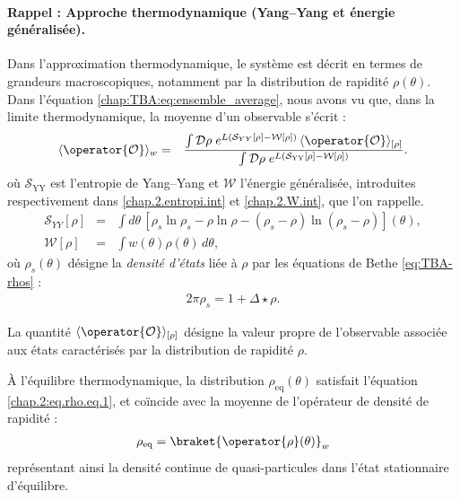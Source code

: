 \begin{mdframed}[
	linewidth=0.5pt, 
	backgroundcolor=gray!5, 
	roundcorner=50pt,	
	innerleftmargin=5pt,
    innerrightmargin=5pt,
    innertopmargin=-10pt,
    innerbottommargin=2pt,
    leftmargin=2pt,
    rightmargin=2pt
	]
\paragraph{Rappel : Approche thermodynamique (Yang–Yang et énergie généralisée).}

Dans l’approximation thermodynamique, le système est décrit en termes de grandeurs macroscopiques, notamment par la distribution de rapidité $\rho(\theta)$.  
Dans l’équation \eqref{chap:TBA:eq:ensemble_average}, nous avons vu que, dans la limite thermodynamique, la moyenne d’un observable s’écrit :
\begin{eqnarray}
	\langle \operator{\mathcal{O}} \rangle_{w} & = & \frac{\int \mathcal{D} \rho \; e^{L (\mathcal{S}_{YY}[\rho] - \mathcal{W}[\rho])} \, \langle\operator{\mathcal{O}}\rangle_{[\rho]}}{\int \mathcal{D} \rho \; e^{L (\mathcal{S}_{\mathrm{YY}}[\rho] - \mathcal{W}[\rho])}}. \label{chap:Fluc:eq:ensemble_average}
\end{eqnarray}
où $\mathcal{S}_{\mathrm{YY}}$ est l’entropie de Yang–Yang et $\mathcal{W}$ l’énergie généralisée, introduites respectivement dans \eqref{chap.2.entropi.int} et \eqref{chap.2.W.int}, que l'on rappelle.
\begin{eqnarray}
	\mathcal{S}_{YY}[\rho] & = & \int d \theta  \, [ \rho_s\ln \rho_s - \rho \ln \rho - ( \rho_s - \rho ) \ln ( \rho_s - \rho ) ] (\theta) , \label{chap.4.entropi.int}\\
	\mathcal{W}[\rho] & = & \int   w(\theta) \rho(\theta) \, d \theta, \label{chap.4.W.int}		
\end{eqnarray}  
où \(\rho_s(\theta)\) désigne la {\em densité d’états} liée à \(\rho\) par les équations de Bethe \eqref{eq:TBA-rhos} :
\begin{eqnarray}
	2\pi \rho_s = 1 + \Delta \star \rho.	
\end{eqnarray}

\medskip

La quantité $\langle\operator{\mathcal{O}}\rangle_{[\rho]}$ désigne la valeur propre de l’observable associée aux états caractérisés par la distribution de rapidité $\rho$.

\medskip

À l’équilibre thermodynamique, la distribution $\rho_{\mathrm{eq}}(\theta)$ satisfait l’équation \eqref{chap.2:eq.rho.eq.1}, et coïncide avec la moyenne de l’opérateur de densité de rapidité :
\begin{eqnarray}
	 \rho_{\mathrm{eq}} =  \braket{ \operator{\rho}(\theta) }_w	
\end{eqnarray}
représentant ainsi la densité continue de quasi-particules dans l’état stationnaire d’équilibre.


\end{mdframed}
